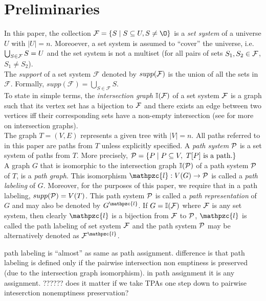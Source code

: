 \documentclass{llncs}
\def\cF{{\cal F}}
\def\cP{{\cal P}}
\def\F{{\mathcal F}}
\def\bI{\mathbb I}
\def\cl{\mathpzc{l}}
\def\cmt{7cm}
\begin{document}
\section{Preliminaries} \label{prelims} 
\noindent
In this paper, the collection $\F = \{S \mid S \subseteq U, S \ne \O
\}$ is a {\em set system} of a universe $U$ with $|U| = n$. 
Moreoever, a set system is assumed to ``cover'' the universe,
i.e. $ \bigcup_{S \in \cF}S = U$ and the set system is not a multiset
(for all pairs of sets $S_1, S_2 \in \cF$, $S_1 \ne S_2$). \\

\noindent
The {\em support} of a set system $\F$ denoted by  $supp(\cF)$ is the
union of all the sets in $\F$. Formally, $supp(\F) =
\bigcup_{S \in \F}S$.\\

\noindent
To state in simple terms, the {\em intersection graph} $\bI(\cF)$ of a
set system $\cF$ is a graph such that its vertex set has a bijection
to $\cF$ and there exists an edge between two vertices iff their
corresponding sets have a non-empty
intersection (see \cite{mcg04} for more on intersection graphs). \\


\noindent
The graph $T=(V,E)$ represents a given tree with $|V| = n$. 
All paths
referred to in this paper are paths from $T$ unless explicitly
specified. A {\em path system} $\cP$ is a set system of paths from
$T$. More precisely, $\cP = \{P \mid P \subseteq V, \text{ } T[P] \text{ is a path.} \}$\\

\noindent
A graph $G$ that is isomorphic to the intersection graph $\bI(\cP)$ of a
path system $\cP$ of $T$, is a {\em path graph}. This
isomorphism $\cl: V(G) \rightarrow \cP$ is called a {\em path
  labeling} of $G$. Moreover, for the purposes of this paper, we
require that in a path labeling, $supp(\cP) = V(T)$. This path system $\cP$ is called a {\em path
representation} of $G$ and may also be denoted by $G^\cl$. If $G =
\bI(\cF)$ where $\cF$ is any set system, then clearly $\cl$ is a
bijection from $\cF$ to $\cP$, $\cl$ is called the
path labeling of set system $\cF$ and the path system $\cP$ may be alternatively
denoted as $\cF^\cl$. \\

\parbox{\cmt}
{path labeling is ``almost'' as same as path assignment. difference
is that path labeling is defined only if the pairwise intersection non
emptiness is preserved (due to the intersection graph isomorphism). in
path assignment it is any assignment. ?????? does it matter if we take
TPAs one step down to pairwise inteserction nonemptiness preservation?\\\\
} 
\end{document}
